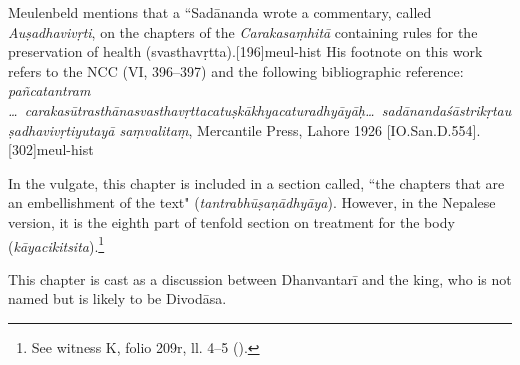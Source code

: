 Meulenbeld mentions that a ``Sadānanda wrote a commentary, called \emph{Auṣadhavivṛti}, on the chapters of the
\emph{Carakasaṃhitā} containing rules for the preservation of health
(svasthavṛtta).[196]{meul-hist} His footnote on this work refers to
the NCC (VI, 396–397) and the following bibliographic reference:
\emph{pañcatantram \ldots\
	carakasūtrasthānasvasthavṛttacatuṣkākhyacaturadhyāyāḥ\ldots\
	sadānandaśāstrikṛtauṣadhavivṛtiyutayā saṃvalitaṃ}, Mercantile Press, Lahore
	1926 [IO.San.D.554].\fvolcite{IB}[302]{meul-hist}

In the vulgate, this chapter is included in a section called, ``the chapters that
are an embellishment of the text" (\emph{tantrabhūṣaṇādhyāya}). However, in
the Nepalese version, it is the eighth part of tenfold section on treatment for the
body (\emph{kāyacikitsita}).\footnote{See witness K, folio 209r, ll. 4--5
	().}

This chapter is cast as a discussion between Dhanvantarī and the king, who is not named but is likely to be Divodāsa.






